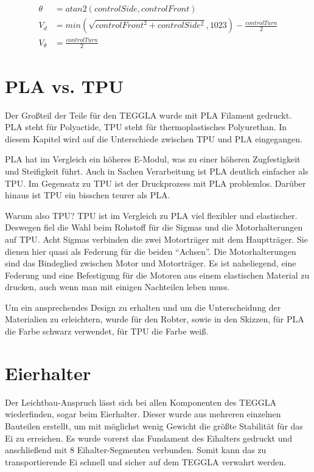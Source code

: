 \begin{align}
	\theta &= atan2(controlSide, controlFront)\\
	V_d &= min(\sqrt{controlFront^2 + controlSide^2}, 1023) - \frac{controlTurn}{2}\\
	V_\theta &= \frac{controlTurn}{2}
\end{align}


\section{PLA vs. TPU}
Der Großteil der Teile für den TEGGLA wurde mit PLA Filament gedruckt. 
PLA steht für Polyactide, TPU steht für thermoplastisches Polyurethan. 
In diesem Kapitel wird auf die Unterschiede zwischen TPU und PLA eingegangen. 

PLA hat im Vergleich ein höheres E-Modul, was zu einer höheren Zugfestigkeit und Steifigkeit führt. 
Auch in Sachen Verarbeitung ist PLA deutlich einfacher als TPU. 
Im Gegensatz zu TPU ist der Druckprozess mit PLA problemlos. 
Darüber hinaus ist TPU ein bisschen teurer als PLA. 

Warum also TPU? TPU ist im Vergleich zu PLA viel flexibler und elastischer. 
Deswegen fiel die Wahl beim Rohstoff für die Sigmas und die Motorhalterungen auf TPU. 
Acht Sigmas verbinden die zwei Motorträger mit dem Hauptträger. 
Sie dienen hier quasi als Federung für die beiden ``Achsen''. 
Die Motorhalterungen sind das Bindeglied zwischen Motor und Motorträger. 
Es ist naheliegend, eine Federung und eine Befestigung für die Motoren aus einem elastischen Material zu drucken, auch wenn man mit einigen Nachteilen leben muss.

Um ein ansprechendes Design zu erhalten und um die Unterscheidung der Materialien zu erleichtern, wurde für den Robter, sowie in den Skizzen, für PLA die Farbe schwarz verwendet, für TPU die Farbe weiß.


\section{Eierhalter}					
Der Leichtbau-Anspruch lässt sich bei allen Komponenten des TEGGLA wiederfinden, sogar beim Eierhalter. 
Dieser wurde aus mehreren einzelnen Bauteilen erstellt, um mit möglichst wenig Gewicht die größte Stabilität für das Ei zu erreichen. 
Es wurde vorerst das Fundament des Eihalters gedruckt und anschließend mit 8 Eihalter-Segmenten verbunden. 
Somit kann das zu transportierende Ei schnell und sicher auf dem TEGGLA verwahrt werden. 

